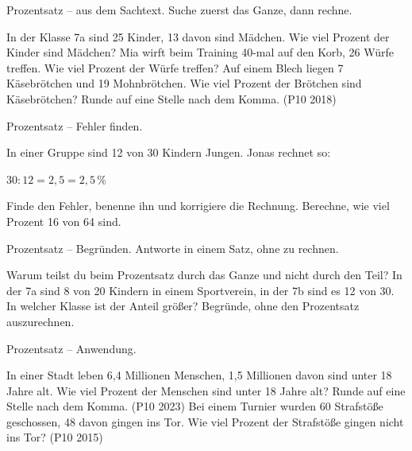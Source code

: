 \documentclass[11pt]{article}
\begin{document}
\begin{aufgabe}{Prozentsatz -- aus dem Sachtext. Suche zuerst das Ganze, dann rechne.}
\begin{teile}
\teil In der Klasse 7a sind 25 Kinder, 13 davon sind Mädchen. Wie viel Prozent der Kinder sind Mädchen? \leerfeld[\%]
\teil Mia wirft beim Training 40-mal auf den Korb, 26 Würfe treffen. Wie viel Prozent der Würfe treffen? \leerfeld[\%]
\teil Auf einem Blech liegen 7 Käsebrötchen und 19 Mohnbrötchen. Wie viel Prozent der Brötchen sind Käsebrötchen? Runde auf eine Stelle nach dem Komma. (P10 2018) \leerfeld[\%]
\end{teile}
\end{aufgabe}

\begin{aufgabe}{Prozentsatz -- Fehler finden.}
\begin{teile}
\teil In einer Gruppe sind 12 von 30 Kindern Jungen. Jonas rechnet so:

$30 : 12 = 2{,}5 = 2{,}5\,\%$

Finde den Fehler, benenne ihn und korrigiere die Rechnung.
\teil Berechne, wie viel Prozent 16 von 64 sind. \leerfeld[\%]
\end{teile}
\end{aufgabe}

\begin{aufgabe}{Prozentsatz -- Begründen. Antworte in einem Satz, ohne zu rechnen.}
\begin{teile}
\teil Warum teilst du beim Prozentsatz durch das Ganze und nicht durch den Teil?
\teil In der 7a sind 8 von 20 Kindern in einem Sportverein, in der 7b sind es 12 von 30. In welcher Klasse ist der Anteil größer? Begründe, ohne den Prozentsatz auszurechnen.
\end{teile}
\end{aufgabe}

\begin{aufgabe}{Prozentsatz -- Anwendung.}
\begin{teile}
\teil In einer Stadt leben 6,4 Millionen Menschen, 1,5 Millionen davon sind unter 18 Jahre alt. Wie viel Prozent der Menschen sind unter 18 Jahre alt? Runde auf eine Stelle nach dem Komma. (P10 2023) \leerfeld[\%]
\teil Bei einem Turnier wurden 60 Strafstöße geschossen, 48 davon gingen ins Tor. Wie viel Prozent der Strafstöße gingen nicht ins Tor? (P10 2015) \leerfeld[\%]
\end{teile}
\end{aufgabe}
\end{document}

